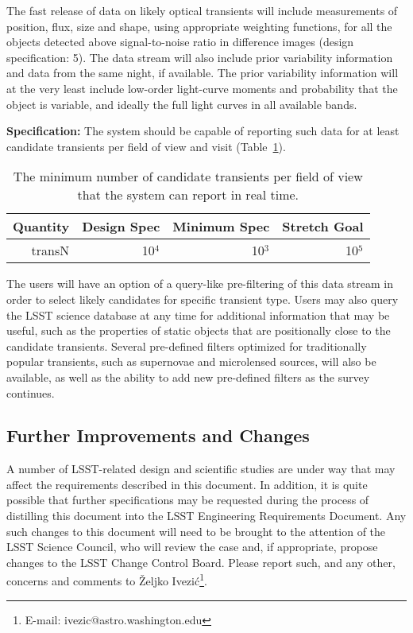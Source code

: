 The fast release of data on likely optical transients will include
measurements of position, flux, size and shape, using appropriate
weighting functions, for all the objects detected above
signal-to-noise ratio in difference images (design specification: 5).
The data stream will also include prior variability information and
data from the same night, if available. The prior variability
information will at the very least include low-order light-curve moments
and probability that the object is variable, and ideally the full
light curves in all available bands.

{\bf Specification:} The system should be capable of reporting such data for
at least    candidate transients per
field of view and visit (Table~\ref{transN}).
\begin{table}[h]
\begin{tabular}{|r|r|r|r|}
\hline
     Quantity         &   Design Spec & Minimum Spec  & Stretch Goal   \\
\hline
    transN              &       10$^4$    &      10$^3$      &       10$^5$     \\
\hline
\end{tabular}
\caption{The minimum number of candidate transients per field
of view that the system can report in real time.}
\label{transN}
\end{table}

The users
will have an option of a query-like pre-filtering of this data stream
in order to select likely candidates for specific transient type. Users
may also query the LSST science database at any time for additional
information that may be useful, such as the properties of static objects
that are positionally close to the candidate transients.
Several pre-defined filters optimized for traditionally popular transients,
such as supernovae and microlensed sources, will also be available,
as well as the ability to add new pre-defined filters as the survey
continues.


\subsection{Further Improvements and Changes}

A number of LSST-related design and scientific studies are under way that
may affect the requirements described in this document. In addition, it is
quite possible that further specifications may be requested during the
process of distilling this document into the LSST Engineering Requirements
Document. Any such changes to this document will need to be brought to the
attention of the LSST Science Council, who will review the case and, if
appropriate, propose changes to the LSST Change Control Board. Please report
such, and any other, concerns and comments to \v{Z}eljko
Ivezi\'{c}\footnote{E-mail: ivezic@astro.washington.edu}.
